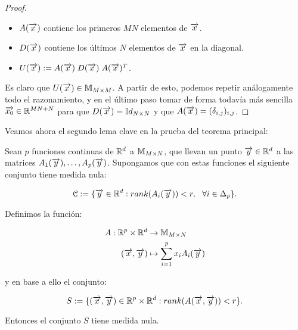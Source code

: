 \begin{proof}
    \begin{itemize}
        \item $A(\overrightarrow{x})$ contiene los primeros $MN$ elementos de $\overrightarrow{x}$.
        \item $D(\overrightarrow{x})$ contiene los últimos $N$ elementos de $\overrightarrow{x}$ en la diagonal.
        \item $U(\overrightarrow{x}) := A(\overrightarrow{x}) \; D(\overrightarrow{x}) \; A(\overrightarrow{x})^T$.
    \end{itemize}

    Es claro que $U(\overrightarrow{x}) \in \mathbb{M}_{M \times M}$. A partir de esto, podemos repetir análogamente todo el razonamiento, y en el último paso tomar de forma todavía más sencilla $\overrightarrow{x_0} \in \mathbb{R}^{MN + N}$ para que $D(\overrightarrow{x}) = \mathbb{I}d_{N \times N}$ y que $A(\overrightarrow{x}) = (\delta_{i, j})_{i, j}$.
\end{proof}

Veamos ahora el segundo lema clave en la prueba del teorema principal:

\begin{lema} \label{lema:segundo_lema}
    Sean $p$ funciones continuas de $\mathbb{R}^d$ a $\mathbb{M}_{M \times N}$, que llevan un punto $\overrightarrow{y} \in \mathbb{R}^d$ a las matrices $A_1(\overrightarrow{y}), \ldots, A_p(\overrightarrow{y})$. Supongamos que con estas funciones el siguiente conjunto tiene medida nula:

    \begin{equation}
        \mathcal{C} := \{ \overrightarrow{y} \in \mathbb{R}^d : rank(A_i(\overrightarrow{y})) < r, \ \  \forall i \in \Delta_{p} \}.
    \end{equation}

    Definimos la función:

    \begin{equation}
        \begin{split}
            A: \mathbb{R}^p \times \mathbb{R}^d &\to \mathbb{M}_{M \times N} \\
            (\overrightarrow{x}, \overrightarrow{y}) &\mapsto \sum_{i = 1}^p x_i A_i(\overrightarrow{y})
        \end{split}
    \end{equation}

    y en base a ello el conjunto:

    \begin{equation}
        S := \{ (\overrightarrow{x}, \overrightarrow{y}) \in  \mathbb{R}^p \times \mathbb{R}^d: rank(A(\overrightarrow{x}, \overrightarrow{y})) < r \}.
    \end{equation}

    Entonces el conjunto $S$ tiene medida nula.
\end{lema}

